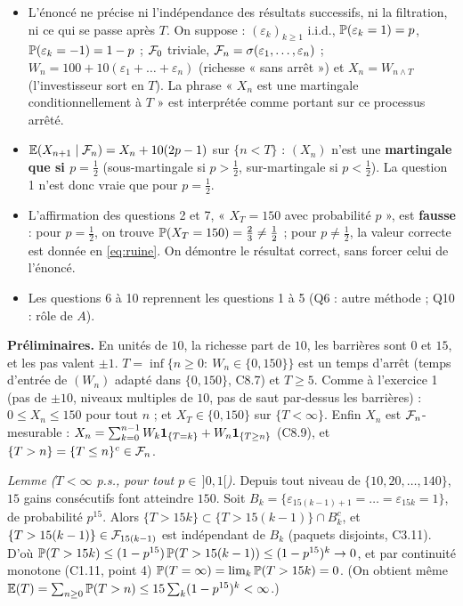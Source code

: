 \documentclass[11pt,a4paper]{article}
\begin{document}
\begin{exo}

\begin{alerte}
\begin{itemize}
  \item L'énoncé ne précise ni l'indépendance des résultats successifs, ni la filtration, ni ce qui se passe après $T$. On suppose :
  $(\varepsilon_k)_{k\ge1}$ i.i.d., $\mathbb{P}(\varepsilon_k=1)=p$, $\mathbb{P}(\varepsilon_k=-1)=1-p$ ; $\mathcal{F}_0$ triviale, $\mathcal{F}_n=\sigma(\varepsilon_1,\dots,\varepsilon_n)$ ;
  $W_n=100+10(\varepsilon_1+\dots+\varepsilon_n)$ (richesse « sans arrêt ») et $X_n=W_{n\wedge T}$ (l'investisseur sort en $T$).
  La phrase « $X_n$ est une martingale conditionnellement à $T$ » est interprétée comme portant sur ce processus arrêté.
  \item $\mathbb{E}(X_{n+1}\mid\mathcal{F}_n)=X_n+10(2p-1)$ sur $\{n<T\}$ : $(X_n)$ n'est une \textbf{martingale que si $p=\frac12$}
  (sous-martingale si $p>\frac12$, sur-martingale si $p<\frac12$). La question 1 n'est donc vraie que pour $p=\frac12$.
  \item L'affirmation des questions 2 et 7, « $X_T=150$ avec probabilité $p$ », est \textbf{fausse} : pour $p=\frac12$, on trouve
  $\mathbb{P}(X_T=150)=\frac23\neq\frac12$ ; pour $p\neq\frac12$, la valeur correcte est donnée en \eqref{eq:ruine}. On démontre le
  résultat correct, sans forcer celui de l'énoncé.
  \item Les questions 6 à 10 reprennent les questions 1 à 5 (Q6 : autre méthode ; Q10 : rôle de $A$).
\end{itemize}
\end{alerte}

\textbf{Préliminaires.} En unités de $10$, la richesse part de $10$, les barrières sont $0$ et $15$, et les pas valent $\pm1$.
$T=\inf\{n\ge0:\ W_n\in\{0,150\}\}$ est un temps d'arrêt (temps d'entrée de $(W_n)$ adapté dans $\{0,150\}$, C8.7) et
$T\ge5$. Comme à l'exercice 1 (pas de $\pm10$, niveaux multiples de $10$, pas de saut par-dessus les barrières) :
$0\le X_n\le150$ pour tout $n$ ; et $X_T\in\{0,150\}$ sur $\{T<\infty\}$. Enfin $X_n$ est $\mathcal{F}_n$-mesurable :
$X_n=\sum_{k=0}^{n-1}W_k\mathbf{1}_{\{T=k\}}+W_n\mathbf{1}_{\{T\ge n\}}$ (C8.9), et $\{T>n\}=\{T\le n\}^c\in\mathcal{F}_n$.

\emph{Lemme ($T<\infty$ p.s., pour tout $p\in\,]0,1[$).} Depuis tout niveau de $\{10,20,\dots,140\}$, $15$ gains consécutifs font
atteindre $150$. Soit $B_k=\{\varepsilon_{15(k-1)+1}=\dots=\varepsilon_{15k}=1\}$, de probabilité $p^{15}$. Alors
$\{T>15k\}\subset\{T>15(k-1)\}\cap B_k^c$, et $\{T>15(k-1)\}\in\mathcal{F}_{15(k-1)}$ est indépendant de $B_k$ (paquets disjoints, C3.11). D'où
$\mathbb{P}(T>15k)\le(1-p^{15})\,\mathbb{P}(T>15(k-1))\le(1-p^{15})^k\to0$, et par continuité monotone (C1.11, point 4)
$\mathbb{P}(T=\infty)=\lim_k\mathbb{P}(T>15k)=0$. (On obtient même $\mathbb{E}(T)=\sum_{n\ge0}\mathbb{P}(T>n)\le15\sum_k(1-p^{15})^k<\infty$.)


\end{exo}
\end{document}
